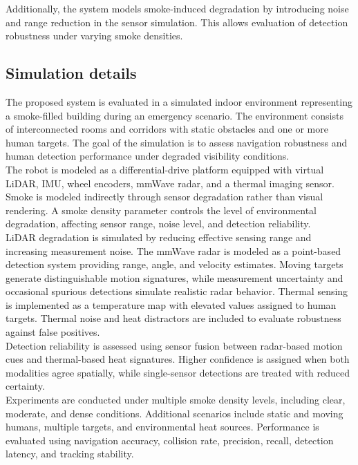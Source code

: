 \documentclass[conference]{IEEEtran}
\begin{document}
Additionally, the system models smoke-induced degradation by introducing noise and range reduction in the sensor simulation. This allows evaluation of detection robustness under varying smoke densities.\\


\subsection*{Simulation details}
The proposed system is evaluated in a simulated indoor environment representing a smoke-filled building during an emergency scenario. The environment consists of interconnected rooms and corridors with static obstacles and one or more human targets. The goal of the simulation is to assess navigation robustness and human detection performance under degraded visibility conditions.\\

The robot is modeled as a differential-drive platform equipped with virtual LiDAR, IMU, wheel encoders, mmWave radar, and a thermal imaging sensor. Smoke is modeled indirectly through sensor degradation rather than visual rendering. A smoke density parameter controls the level of environmental degradation, affecting sensor range, noise level, and detection reliability.\\

LiDAR degradation is simulated by reducing effective sensing range and increasing measurement noise. The mmWave radar is modeled as a point-based detection system providing range, angle, and velocity estimates. Moving targets generate distinguishable motion signatures, while measurement uncertainty and occasional spurious detections simulate realistic radar behavior. Thermal sensing is implemented as a temperature map with elevated values assigned to human targets. Thermal noise and heat distractors are included to evaluate robustness against false positives.\\

Detection reliability is assessed using sensor fusion between radar-based motion cues and thermal-based heat signatures. Higher confidence is assigned when both modalities agree spatially, while single-sensor detections are treated with reduced certainty.\\

Experiments are conducted under multiple smoke density levels, including clear, moderate, and dense conditions. Additional scenarios include static and moving humans, multiple targets, and environmental heat sources. Performance is evaluated using navigation accuracy, collision rate, precision, recall, detection latency, and tracking stability.\\
\end{document}

